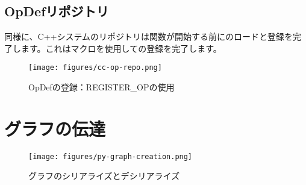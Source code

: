 \begin{content}
\subsection{OpDefリポジトリ}

同様に、C++システムのリポジトリは関数が開始する前にのロードと登録を完了します。これはマクロを使用しての登録を完了します。

\begin{figure}[H]
\centering
\texttt{[image: figures/cc-op-repo.png]}
\caption{OpDefの登録：REGISTER\_OPの使用}
 \label{fig:cc-op-repo}
\end{figure}

\end{content}

\section{グラフの伝達}

\begin{content}

\begin{figure}[H]
\centering
\texttt{[image: figures/py-graph-creation.png]}
\caption{グラフのシリアライズとデシリアライズ}
 \label{fig:py-graph-creation}
\end{figure}

\end{content}
